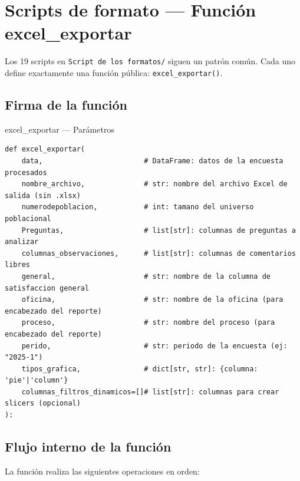 \documentclass[12pt, letterpaper]{article}
\begin{document}
\section{Scripts de formato — Función excel\_exportar}

Los 19 scripts en \texttt{Script de los formatos/} siguen un patrón común. Cada uno define exactamente una función pública: \texttt{excel\_exportar()}.

\subsection{Firma de la función}

\begin{apibox}{excel\_exportar — Parámetros}
\begin{lstlisting}
def excel_exportar(
    data,                        # DataFrame: datos de la encuesta procesados
    nombre_archivo,              # str: nombre del archivo Excel de salida (sin .xlsx)
    numerodepoblacion,           # int: tamano del universo poblacional
    Preguntas,                   # list[str]: columnas de preguntas a analizar
    columnas_observaciones,      # list[str]: columnas de comentarios libres
    general,                     # str: nombre de la columna de satisfaccion general
    oficina,                     # str: nombre de la oficina (para encabezado del reporte)
    proceso,                     # str: nombre del proceso (para encabezado del reporte)
    perido,                      # str: periodo de la encuesta (ej: "2025-1")
    tipos_grafica,               # dict[str, str]: {columna: 'pie'|'column'}
    columnas_filtros_dinamicos=[]# list[str]: columnas para crear slicers (opcional)
):
\end{lstlisting}
\end{apibox}

\subsection{Flujo interno de la función}

La función realiza las siguientes operaciones en orden:
\end{document}
